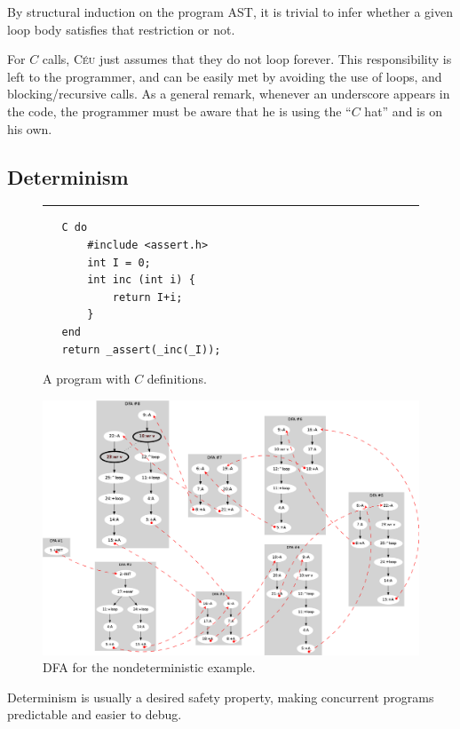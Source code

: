 \documentclass{sigplan-proc}
\newcommand{\2}{\;\;}
\newcommand{\5}{\;\;\;\;\;}
\newcommand{\CEU}{\textsc{C\'{e}u}}
\begin{document}
By structural induction on the program AST, it is trivial to infer whether a 
given loop body satisfies that restriction or not.

For $C$ calls, \CEU{} just assumes that they do not loop forever.
This responsibility is left to the programmer, and can be easily met by 
avoiding the use of loops, and blocking/recursive calls.
As a general remark, whenever an underscore appears in the code, the programmer 
must be aware that he is using the ``$C$ hat'' and is on his own.

\subsection{Determinism}
\label{sec:ceu:det}

\begin{figure}[t]
\rule{8.5cm}{0.37pt}
{\small
\begin{verbatim}
   C do
       #include <assert.h>
       int I = 0;
       int inc (int i) {
           return I+i;
       }
   end
   return _assert(_inc(_I));
\end{verbatim}
}
\caption{ A program with $C$ definitions.
\label{lst:ceu:c}
}
\end{figure}

\begin{figure}[t]
\centering
\includegraphics[scale=0.25]{dfa/dfa.png}
\caption{ DFA for the nondeterministic example.
\label{fig:dfa}
}
\end{figure}

Determinism is usually a desired safety property, making concurrent programs 
predictable and easier to debug.
\end{document}
